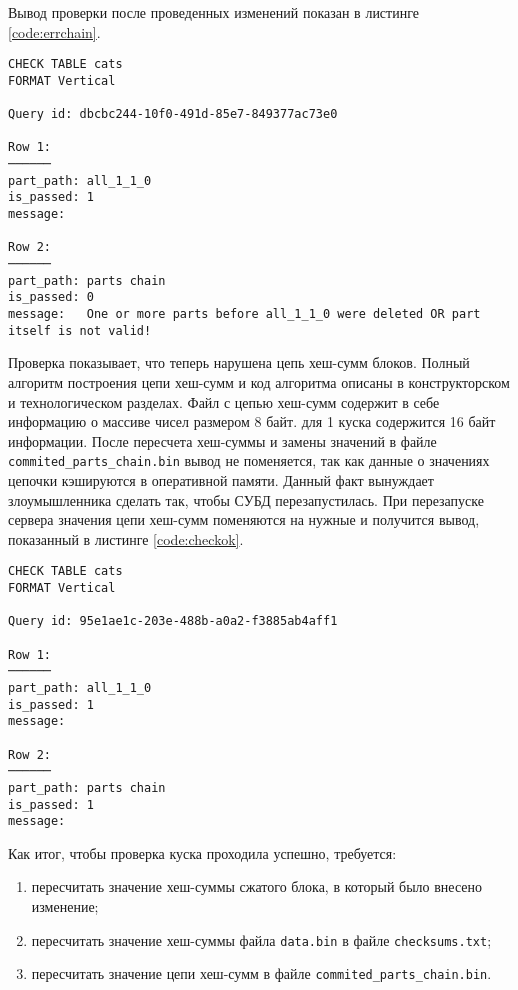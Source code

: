 Вывод проверки после проведенных изменений показан в листинге \ref{code:errchain}.

\begin{lstlisting}[label=code:errchain, caption={Результат проверки после исправления \texttt{checksums.txt}}]
CHECK TABLE cats
FORMAT Vertical

Query id: dbcbc244-10f0-491d-85e7-849377ac73e0

Row 1:
──────
part_path: all_1_1_0
is_passed: 1
message:

Row 2:
──────
part_path: parts chain
is_passed: 0
message:   One or more parts before all_1_1_0 were deleted OR part itself is not valid!
\end{lstlisting}

Проверка показывает, что теперь нарушена цепь хеш-сумм блоков. Полный алгоритм построения цепи хеш-сумм и код алгоритма описаны в конструкторском и технологическом разделах. Файл с цепью хеш-сумм содержит в себе информацию о массиве чисел размером 8 байт. для 1 куска содержится 16 байт информации. После пересчета хеш-суммы и замены значений в файле \\ \texttt{commited\_parts\_chain.bin} вывод не поменяется, так как данные о значениях цепочки кэшируются в оперативной памяти. Данный факт вынуждает злоумышленника сделать так, чтобы СУБД перезапустилась. При перезапуске сервера значения цепи хеш-сумм поменяются на нужные и получится вывод, показанный в листинге \ref{code:checkok}.

\begin{lstlisting}[label=code:checkok, caption={Результат проверки после исправления \texttt{commited\_parts\_chain.bin}.}]
CHECK TABLE cats
FORMAT Vertical

Query id: 95e1ae1c-203e-488b-a0a2-f3885ab4aff1

Row 1:
──────
part_path: all_1_1_0
is_passed: 1
message:

Row 2:
──────
part_path: parts chain
is_passed: 1
message:
\end{lstlisting}

Как итог, чтобы проверка куска проходила успешно, требуется:
\begin{enumerate}
    \item пересчитать значение хеш-суммы сжатого блока, в который было внесено изменение;
    \item пересчитать значение хеш-суммы файла \texttt{data.bin} в файле \texttt{checksums.txt};
    \item пересчитать значение цепи хеш-сумм в файле \texttt{commited\_parts\_chain.bin}.
\end{enumerate}

